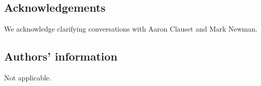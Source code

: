 \subsection{Acknowledgements}
We acknowledge clarifying conversations with Aaron Clauset and Mark Newman. 

\subsection{Authors' information}
Not applicable. 


  
  





